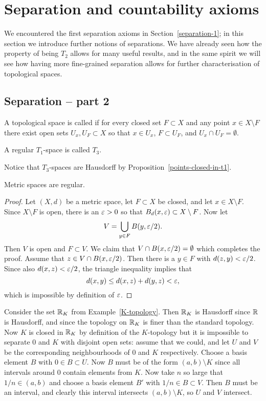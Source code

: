 \section{Separation and countability axioms}
\label{separation}
We encountered the first separation axioms in Section~\ref{separation-1}; in this section we introduce further notions of separations. We have already seen how the property of being $T_2$ allows for many useful results, and in the same spirit we will see how having more fine-grained separation allows for further characterisation of topological spaces.
\subsection{Separation -- part 2}
\begin{defn}
  A topological space is called  if for every closed set $F \subset X$ and any point $x \in X \setminus F$ there exist open sets $U_x, U_F \subset X$ so that $x \in U_x$, $F \subset U_F$, and $U_x \cap U_F = \emptyset$.
  
  A regular $T_1$-space is called $T_3$.
\end{defn}
Notice that $T_3$-spaces are Hausdorff by Proposition~\ref{points-closed-in-t1}.
\begin{prop}
  Metric spaces are regular.
\end{prop}
\begin{proof}
  Let $(X,d)$ be a metric space, let $F \subset X$ be closed, and let $x \in X \setminus F$. Since $X \setminus F$ is open, there is an $\varepsilon > 0$ so that $B_d(x,\varepsilon) \subset X \setminus F$. Now let
  \[
    V = \bigcup_{y \in F} B(y,\varepsilon/2).
  \]
  Then $V$ is open and $F \subset V$. We claim that $V \cap B(x,\varepsilon/2) = \emptyset$ which completes the proof. Assume that $z \in V \cap B(x,\varepsilon/2)$. Then there is a $y \in F$ with $d(z,y) < \varepsilon/2$. Since also $d(x,z) < \varepsilon/2$, the triangle inequality implies that
  \[
    d(x,y) \leq d(x,z) + d(y,z) < \varepsilon,
  \]
  which is impossible by definition of $\varepsilon$.
\end{proof}
\begin{example}
  Consider the set $\mathbb{R}_K$ from Example~\ref{K-topology}. Then $\mathbb{R}_K$ is Hausdorff since $\mathbb{R}$ is Hausdorff, and since the topology on $\mathbb{R}_K$ is finer than the standard topology. Now $K$ is closed in $\mathbb{R}_K$ by definition of the $K$-topology but it is impossible to separate $0$ and $K$ with disjoint open sets: assume that we could, and let $U$ and $V$ be the corresponding neighbourhoods of $0$ and $K$ respectively. Choose a basis element $B$ with $0 \in B \subset U$. Now $B$ must be of the form $(a,b) \setminus K$ since all intervals around $0$ contain elements from $K$. Now take $n$ so large that $1/n \in (a,b)$ and choose a basis element $B'$ with $1/n \in B \subset V$. Then $B$ must be an interval, and clearly this interval intersects $(a,b) \setminus K$, so $U$ and $V$ intersect.
\end{example}
